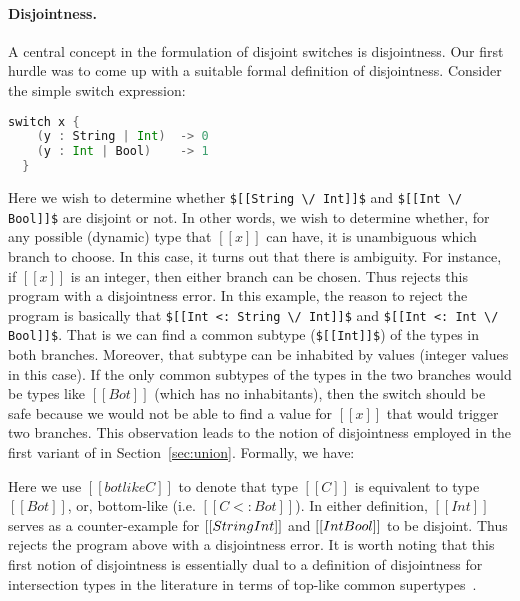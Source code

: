 
\paragraph*{Disjointness.}
A central concept in the formulation of disjoint switches is disjointness.
Our first hurdle was to come up with a suitable formal definition of disjointness.
Consider the simple \name switch expression:
\begin{lstlisting}[language=Scala]
  switch x {
    (y : String | Int)  -> 0
    (y : Int | Bool)    -> 1
  }
\end{lstlisting}

Here we wish to determine whether \lstinline{$[[String \/ Int]]$}
and \lstinline{$[[Int \/ Bool]]$}
are disjoint or not. In other words, we wish to determine whether, for any possible
(dynamic) type that $[[x]]$ can have, it is unambiguous which branch to choose.
In this case, it turns out that there is ambiguity. For instance, if $[[x]]$ is an integer,
then either branch can be chosen. Thus \name rejects this program with a disjointness error.
In this example, the reason to reject the program is basically that
\lstinline{$[[Int <: String \/ Int]]$} and \lstinline{$[[Int <: Int \/ Bool]]$}.
That is we can find a common subtype (\lstinline{$[[Int]]$}) of the
types in both branches. Moreover, that subtype can be inhabited by values (integer values
in this case). If the only common subtypes of the types in the two branches
would be types like $[[Bot]]$ (which has no inhabitants), then the switch should
be safe because we would not be able to find a value for $[[x]]$ that would trigger
two branches.
This observation
leads to the notion of disjointness employed in the first variant of \name in Section~\ref{sec:union}.
Formally, we have:


Here we use $[[botlike C]]$ to denote that type $[[C]]$ is equivalent to
type $[[Bot]]$, or, bottom-like (i.e. $[[C <: Bot]]$).
In either definition, $[[Int]]$ serves as a counter-example for $[[String\/Int]]$
and $[[Int\/Bool]]$ to be disjoint. Thus \name rejects the program above with
a disjointness error. It is worth noting that this first notion of
disjointness is essentially dual to a definition of disjointness for intersection
types in the literature in terms of top-like common supertypes~\citep{oliveira2016disjoint}.

